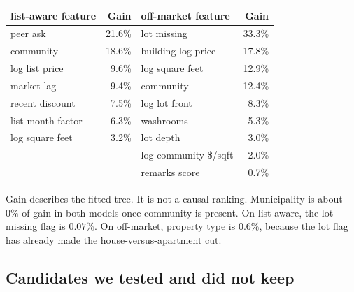 \documentclass[11pt]{article}
\newcommand{\la}{list-aware}
\newcommand{\om}{off-market}
\begin{document}
\begin{center}
\small
\begin{tabular}{lr@{\hspace{1.6em}}lr}
\toprule
\la{} feature & Gain & \om{} feature & Gain \\
\midrule
peer ask & 21.6\% & lot missing & 33.3\% \\
community & 18.6\% & building log price & 17.8\% \\
log list price & 9.6\% & log square feet & 12.9\% \\
market lag & 9.4\% & community & 12.4\% \\
recent discount & 7.5\% & log lot front & 8.3\% \\
list-month factor & 6.3\% & washrooms & 5.3\% \\
log square feet & 3.2\% & lot depth & 3.0\% \\
 & & log community \$/sqft & 2.0\% \\
 & & remarks score & 0.7\% \\
\bottomrule
\end{tabular}
\end{center}

Gain describes the fitted tree. It is not a causal ranking. Municipality is about \(0\%\) of gain in both models once community is present. On \la, the lot-missing flag is \(0.07\%\). On \om, property type is \(0.6\%\), because the lot flag has already made the house-versus-apartment cut.

\subsection{Candidates we tested and did not keep}
\end{document}
